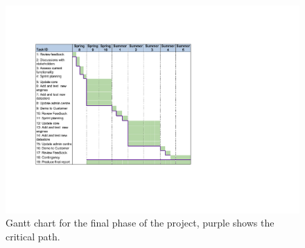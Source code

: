 \begin{figure}[H]
  \centering
  \includegraphics[width= 12cm]{images/GantFinal.pdf}
  \caption{Gantt chart for the final phase of the project, purple shows the critical path.}
  \label{fig:ganttFinal}
\end{figure}
